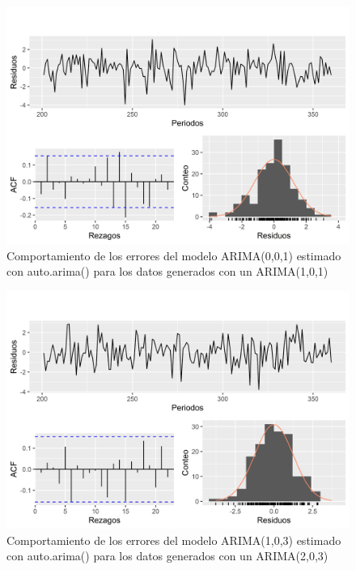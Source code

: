 \documentclass[
]{article}
\begin{document}
\begin{figure}[H]
\includegraphics[width=1\linewidth,height=1\textheight]{Tesis_files/figure-latex/errores_simulados_autoarima2-1} \caption{Comportamiento de los errores del modelo ARIMA(0,0,1) estimado con auto.arima() para los datos generados con un ARIMA(1,0,1)}\label{fig:errores_simulados_autoarima2}
\end{figure}

\begin{figure}[H]
\includegraphics[width=1\linewidth,height=1\textheight]{Tesis_files/figure-latex/errores_simulados_autoarima3-1} \caption{Comportamiento de los errores del modelo ARIMA(1,0,3) estimado con auto.arima() para los datos generados con un ARIMA(2,0,3)}\label{fig:errores_simulados_autoarima3}
\end{figure}
\end{document}

